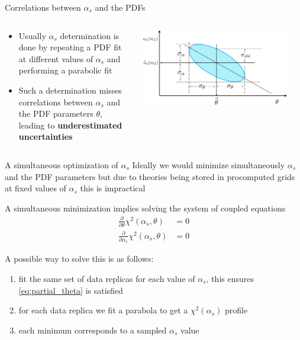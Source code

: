 \documentclass[aspectratio=169, 9pt,t]{beamer}
\begin{document}
\begin{frame}{Correlations between $\alpha_s$ and the PDFs}
  \begin{columns}[T]
    \begin{column}{0.49\textwidth}
      \begin{itemize}
        \item Usually $\alpha_s$ determination is done by repeating a PDF fit at different values of $\alpha_s$ and performing a parabolic fit
        \item Such a determination misses correlations between $\alpha_s$ and the PDF parameters $\theta$, leading to \textbf{underestimated uncertainties}
      \end{itemize}
    \end{column}
    \begin{column}{0.49\textwidth}
      \includegraphics[width=0.9\textwidth]{ellipse.pdf}
    \end{column}
  \end{columns}
\end{frame}


\begin{frame}{A simultaneous optimization of $\alpha_s$}
  Ideally we would minimize simultaneously $\alpha_s$ and the PDF parameters but due to theories being stored in procomputed grids at fixed values of $\alpha_s$ this is impractical

  A simultaneous minimization implies solving the system of coupled equations
  \begin{align}
    \label{eq:partial_theta}
    \frac{\partial}{\partial \theta} \chi^2(\alpha_s, \theta) &= 0 \\
    \frac{\partial}{\partial \alpha_s} \chi^2(\alpha_s, \theta) &= 0
  \end{align}

  A possible way to solve this is as follows:
  \begin{enumerate}
    \item fit the same set of data replicas for each value of $\alpha_s$, this ensures \eqref{eq:partial_theta} is satisfied
    \item for each data replica we fit a parabola to get a $\chi^2(\alpha_s)$ profile
    \item each minimum corresponds to a sampled $\alpha_s$ value
  \end{enumerate}

\end{frame}
\end{document}
